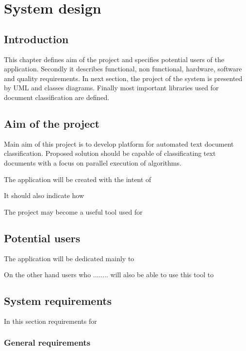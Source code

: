 \chapter{System design}
\label{des}
\section{Introduction}
This chapter defines aim of the project and specifies potential users of the application. Secondly it describes functional, non functional, hardware, software and quality requirements. In next section, the project of the system is presented by UML and classes diagrams. Finally most important libraries used for document classification are defined. 


\section{Aim of the project}
Main aim of this project is to develop platform for automated text document classification. Proposed solution should be capable of classificating text documents with a focus on parallel execution of algorithms.


The application will be created with the intent of 

It should also indicate how 

The project may become a useful tool used for 



\section{Potential users}
\label{users}

The application will be dedicated mainly to 

On the other hand users who ........ will also be able to use this tool to 


\section{System requirements}
In this section requirements for

\subsection{General requirements}


